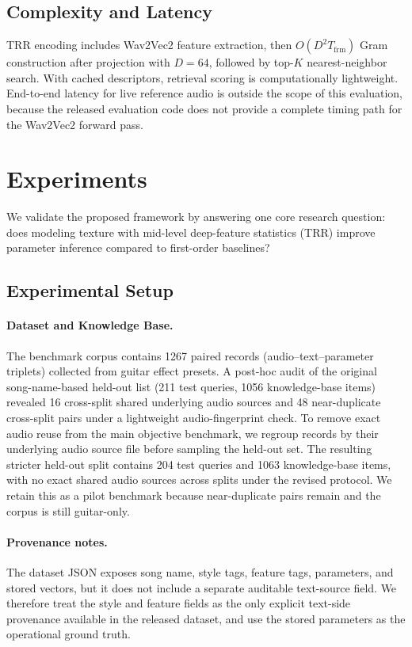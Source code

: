 \subsection{Complexity and Latency}
\label{ssec:complexity_latency}
TRR encoding includes Wav2Vec2 feature extraction, then $O(D^2T_{\mathrm{frm}})$ Gram construction after projection with $D=64$, followed by top-$K$ nearest-neighbor search. With cached descriptors, retrieval scoring is computationally lightweight. End-to-end latency for live reference audio is outside the scope of this evaluation, because the released evaluation code does not provide a complete timing path for the Wav2Vec2 forward pass.

\section{Experiments}
\label{sec:experiments}

We validate the proposed framework by answering one core research question: does modeling texture with mid-level deep-feature statistics (TRR) improve parameter inference compared to first-order baselines?

\subsection{Experimental Setup}

\paragraph{Dataset and Knowledge Base.}
The benchmark corpus contains 1267 paired records (audio--text--parameter triplets) collected from guitar effect presets. A post-hoc audit of the original song-name-based held-out list (211 test queries, 1056 knowledge-base items) revealed 16 cross-split shared underlying audio sources and 48 near-duplicate cross-split pairs under a lightweight audio-fingerprint check. To remove exact audio reuse from the main objective benchmark, we regroup records by their underlying audio source file before sampling the held-out set. The resulting stricter held-out split contains 204 test queries and 1063 knowledge-base items, with no exact shared audio sources across splits under the revised protocol. We retain this as a pilot benchmark because near-duplicate pairs remain and the corpus is still guitar-only.

\paragraph{Provenance notes.}
The dataset JSON exposes song name, style tags, feature tags, parameters, and stored vectors, but it does not include a separate auditable text-source field. We therefore treat the style and feature fields as the only explicit text-side provenance available in the released dataset, and use the stored parameters as the operational ground truth.

